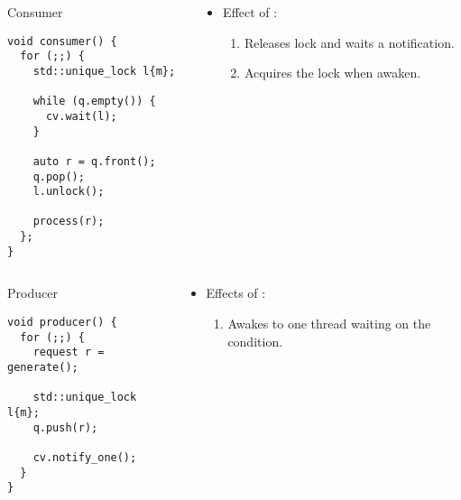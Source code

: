 \begin{frame}[t,fragile]
\begin{columns}

\begin{column}{.5\textwidth}
\begin{block}{Consumer}
\begin{lstlisting}
void consumer() {
  for (;;) {
    std::unique_lock l{m};

    while (q.empty()) {
      cv.wait(l);
    }

    auto r = q.front();
    q.pop();
    l.unlock();
   
    process(r);
  };
}
\end{lstlisting}
\end{block}
\end{column}

\begin{column}{.5\textwidth}
\begin{itemize}
  \item Effect of :
    \begin{enumerate}
      \item Releases lock and waits a notification.
      \item Acquires the lock when awaken.
    \end{enumerate}
\end{itemize}
\end{column}

\end{columns}
\end{frame}

\begin{frame}[t,fragile]
\begin{columns}
\begin{column}{.5\textwidth}
\begin{block}{Producer}
\begin{lstlisting}
void producer() {
  for (;;) {
    request r = generate();

    std::unique_lock l{m};
    q.push(r);

    cv.notify_one();
  }
}
\end{lstlisting}
\end{block}
\end{column}

\begin{column}{.5\textwidth}
\begin{itemize}
\item Effects of :
  \begin{enumerate}
    \item Awakes to one thread waiting on the condition.
  \end{enumerate}
\end{itemize}
\end{column}

\end{columns}
\end{frame}

